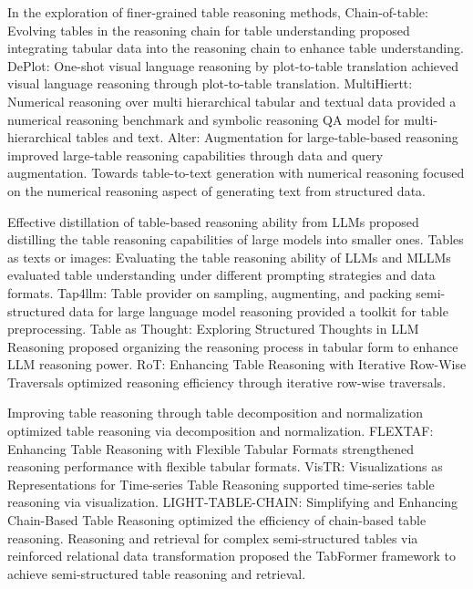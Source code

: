 In the exploration of finer-grained table reasoning methods, Chain-of-table: Evolving tables in the reasoning chain for table understanding \cite{zhang2023chainoftable} proposed integrating tabular data into the reasoning chain to enhance table understanding. DePlot: One-shot visual language reasoning by plot-to-table translation \cite{liu2023deplot} achieved visual language reasoning through plot-to-table translation. MultiHiertt: Numerical reasoning over multi hierarchical tabular and textual data \cite{wang2023multihiertt} provided a numerical reasoning benchmark and symbolic reasoning QA model for multi-hierarchical tables and text. Alter: Augmentation for large-table-based reasoning \cite{kim2023alter} improved large-table reasoning capabilities through data and query augmentation. Towards table-to-text generation with numerical reasoning \cite{gao2023tabletotext} focused on the numerical reasoning aspect of generating text from structured data.

Effective distillation of table-based reasoning ability from LLMs \cite{chen2023tablellmdistill} proposed distilling the table reasoning capabilities of large models into smaller ones. Tables as texts or images: Evaluating the table reasoning ability of LLMs and MLLMs \cite{singh2023tablesastext} evaluated table understanding under different prompting strategies and data formats. Tap4llm: Table provider on sampling, augmenting, and packing semi-structured data for large language model reasoning \cite{liu2024tap4llm} provided a toolkit for table preprocessing. Table as Thought: Exploring Structured Thoughts in LLM Reasoning \cite{huang2023tableasthought} proposed organizing the reasoning process in tabular form to enhance LLM reasoning power. RoT: Enhancing Table Reasoning with Iterative Row-Wise Traversals \cite{xu2023rot} optimized reasoning efficiency through iterative row-wise traversals.

Improving table reasoning through table decomposition and normalization \cite{li2023tabulardecompose} optimized table reasoning via decomposition and normalization. FLEXTAF: Enhancing Table Reasoning with Flexible Tabular Formats \cite{wang2024flextaf} strengthened reasoning performance with flexible tabular formats. VisTR: Visualizations as Representations for Time-series Table Reasoning \cite{zhang2024vistr} supported time-series table reasoning via visualization. LIGHT-TABLE-CHAIN: Simplifying and Enhancing Chain-Based Table Reasoning \cite{chen2024lighttablechain} optimized the efficiency of chain-based table reasoning. Reasoning and retrieval for complex semi-structured tables via reinforced relational data transformation \cite{liu2023tabformer} proposed the TabFormer framework to achieve semi-structured table reasoning and retrieval.

